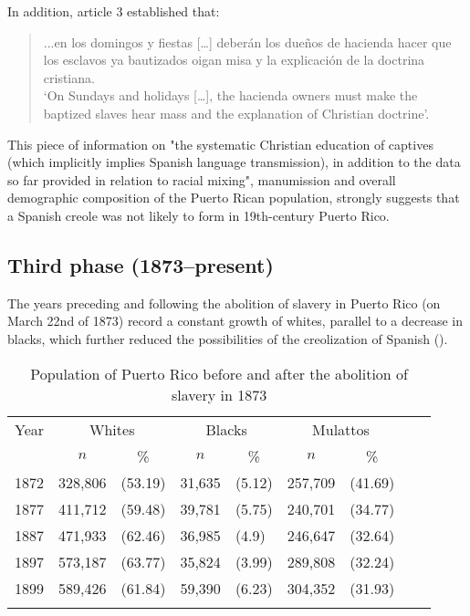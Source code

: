 \documentclass[output=paper,colorlinks,citecolor=brown]{langscibook}
\begin{document}
In addition, article 3 established that:

\begin{quote}
...en los domingos y fiestas […] deberán los dueños de hacienda hacer que los esclavos ya bautizados oigan misa y la explicación de la doctrina cristiana.\\
`On Sundays and holidays […], the hacienda owners must make the baptized slaves hear mass and the explanation of Christian doctrine'.
\end{quote}

This piece of information on "the systematic Christian education of captives (which implicitly implies  Spanish language transmission), in addition to the data so far provided in relation to racial mixing", manumission and overall demographic composition of the Puerto Rican population, strongly suggests that a Spanish creole was not likely to form in 19th-century Puerto Rico. 

\subsection{Third phase (1873–present)}

The years preceding and following the abolition of slavery in Puerto Rico (on March 22nd of 1873) record a constant growth of whites, parallel to a decrease in blacks, which further reduced the possibilities of the creolization of Spanish (\citealt[78--79]{AlvarezNazario1974}).

\begin{table}
\begin{tabular}{c *4{r@{ }l}}
\lsptoprule
 {Year} & \multicolumn{2}{c}{Whites} & \multicolumn{2}{c}{Blacks} & \multicolumn{2}{c}{Mulattos}\\\cmidrule(lr){2-3}\cmidrule(lr){4-5}\cmidrule(lr){6-7}
        & \multicolumn{1}{c}{$n$} & \multicolumn{1}{c}{\%}& \multicolumn{1}{c}{$n$} & \multicolumn{1}{c}{\%}& \multicolumn{1}{c}{$n$} & \multicolumn{1}{c}{\%}\\\midrule
 1872 & 328,806 & (53.19) & 31,635 & (5.12) & 257,709 & (41.69)\\
 1877 & 411,712 & (59.48) & 39,781 & (5.75) & 240,701 & (34.77)\\
 1887 & 471,933 & (62.46) & 36,985 &  (4.9) & 246,647 & (32.64)\\
 1897 & 573,187 & (63.77) & 35,824 & (3.99) & 289,808 & (32.24)\\
 1899 & 589,426 & (61.84) & 59,390 & (6.23) & 304,352 & (31.93)\\
\lspbottomrule
\end{tabular}
\caption{Population of Puerto Rico before and after the abolition of slavery in 1873\label{tab:visconti:9}}
\end{table}
\end{document}

